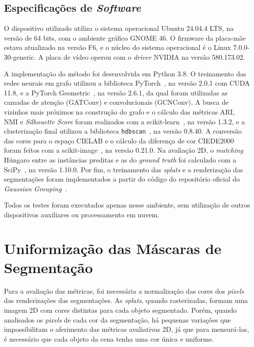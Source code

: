\subsection{Especificações de \textit{Software}}
O dispositivo utilizado utiliza o sistema operacional Ubuntu 24.04.4 LTS, na versão de 64 bits, com o ambiente gráfico GNOME 46. O firmware da placa-mãe estava atualizado na versão F6, e o núcleo do sistema operacional é o Linux 7.0.0-30-generic. A placa de vídeo operou com o \textit{driver} NVIDIA na versão 580.173.02.

A implementação do método foi desenvolvida em Python 3.8. O treinamento das redes neurais em grafo utilizou a biblioteca PyTorch~\cite{paszke2019pytorch}, na versão 2.0.1 com CUDA 11.8, e a PyTorch Geometric~\cite{fey2019fast}, na versão 2.6.1, da qual foram utilizadas as camadas de atenção (GATConv) e convolucionais (GCNConv). A busca de vizinhos mais próximos na construção do grafo e o cálculo das métricas ARI, NMI e \textit{Silhouette Score} foram realizados com a scikit-learn~\cite{pedregosa2011scikit}, na versão 1.3.2, e a clusterização final utilizou a biblioteca \texttt{hdbscan}~\cite{mcinnes2017hdbscan}, na versão 0.8.40. A conversão das cores para o espaço CIELAB e o cálculo da diferença de cor CIEDE2000 foram feitos com a scikit-image~\cite{van2014scikit}, na versão 0.21.0. Na avaliação 2D, o \textit{matching} Húngaro entre as instâncias preditas e as do \textit{ground truth} foi calculado com a SciPy~\cite{virtanen2020scipy}, na versão 1.10.0. Por fim, o treinamento das \emph{splats} e a renderização das segmentações foram implementados a partir do código do repositório oficial do \textit{Gaussian Grouping}~\cite{ye2024gaussian}.

Todos os testes foram executados apenas nesse ambiente, sem utilização de outros dispositivos auxiliares ou processamento em nuvem.

\section{Uniformização das Máscaras de Segmentação}
\label{sec:uniformizacao_mascaras}
Para a avaliação das métricas, foi necessária a normalização das cores dos \textit{pixels} das renderizações das segmentações. As \emph{splats}, quando rasterizadas, formam uma imagem 2D com cores distintas para cada objeto segmentado. Porém, quando analisados os \textit{pixels} de cada cor da segmentação, há pequenas variações que impossibilitam o aferimento das métricas avaliativas 2D, já que para mensurá-las, é necessário que cada objeto da cena tenha uma cor única e uniforme.

